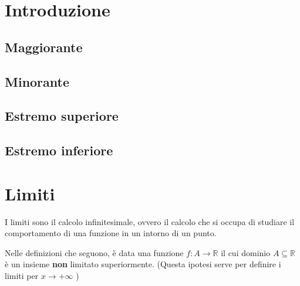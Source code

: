 \documentclass[a4paper]{article}
\theoremstyle{break}
\theoremstyle{break}
\theoremstyle{break}
\theoremstyle{break}
\begin{document}


\tableofcontents
\pagebreak

\section{Introduzione}
\subsection{Maggiorante}

\subsection{Minorante}

\subsection{Estremo superiore}

\subsection{Estremo inferiore}

\section{Limiti}
I limiti sono il calcolo infinitesimale, ovvero il
calcolo che si occupa di studiare il comportamento di una funzione in un intorno
di un punto.

Nelle definizioni che seguono, è data una funzione \( f:A \to \mathbb{R} \) il cui
dominio \( A \subseteq \mathbb{R} \) è un insieme \textbf{non} limitato superiormente.
(Questa ipotesi serve per definire i limiti per \( x \to +\infty \) )
\end{document}
